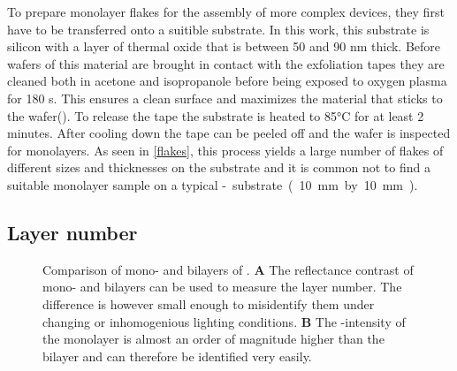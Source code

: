 To prepare monolayer flakes for the assembly of more complex devices, they first have to be transferred onto a suitible substrate. In this work, this substrate is silicon with a layer of thermal oxide that is between 50 and 90 nm thick. Before wafers of this material are brought in contact with the exfoliation tapes they are cleaned both in acetone and isopropanole before being exposed to oxygen plasma for 180 s. This ensures a clean surface and maximizes the material that sticks to the wafer(\cite{pizzocchero_hot_2016}). To release the tape the substrate is heated to 85°C for at least 2 minutes. After cooling down the tape can be peeled off and the wafer is inspected for monolayers. As seen in \ref{flakes}, this process yields a large number of flakes of different sizes and thicknesses on the substrate and it is common not to find a suitable monolayer sample on a typical \si-substrate (10 mm by 10 mm). 

\subsection{Layer number}

\begin{figure}
	\centering
	\begin{subfigure}{0.4\textwidth}
	\caption{}
	\end{subfigure}
	\begin{subfigure}{0.4\textwidth}
	\caption{}
	\end{subfigure}
	\caption{Comparison of mono- and bilayers of \wse\!. \textbf{A} The reflectance contrast of mono- and bilayers can be used to measure the layer number. The difference is however small enough to misidentify them under changing or inhomogenious lighting conditions. \textbf{B} The \pl-intensity of the monolayer is almost an order of magnitude higher than the bilayer and can therefore be identified very easily.}
	\label{pl-contrast}
\end{figure}

